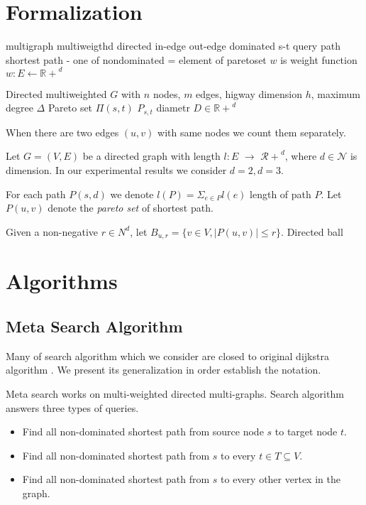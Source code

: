 
\section{Formalization}
multigraph 
multiweigthd
directed
in-edge out-edge
dominated
s-t query
path
shortest path - one of nondominated = element of paretoset
$w$ is weight function $w: E \leftarrow \mathbb{R+}^d$

Directed multiweighted $G$ with
$n$ nodes,
$m$ edges,
higway dimension $h$,
maximum degree $\Delta$
Pareto set $\Pi(s,t)$ $P_{s,t}$
diametr $D \in \mathbb{R+}^d$

When there are two edges $(u,v)$ with same nodes we count them
separately. 


Let $G = (V,E)$ be a directed graph with length
$l: E$ 
$ \rightarrow $
$\mathcal{R+}^d$, 
where $d \in \mathcal{N}$ is
dimension. In our experimental results
we consider $d=2, d=3$.

For each path $P(s,d)$ we denote 
$l(P) = \Sigma_{e\in P} l(e) $
length of path $P$.
Let $P(u,v)$ denote the \emph{pareto set} of shortest path.

Given a non-negative $r \in \mathcal{}{N}^d $, let $B_{u,r} = 
\{ v \in V, |P(u,v)| \le r \} $.
Directed ball


\section{Algorithms}

\subsection{Meta Search Algorithm}

Many of search algorithm which we consider
are closed to original dijkstra algorithm \cite{dijkstra1959note}.
We present its generalization in order establish the notation.

Meta search works on multi-weighted directed multi-graphs. 
Search algorithm answers three types of queries.
\begin{itemize}
\item Find all non-dominated shortest path from source node $s$ to target node $t$.
\item Find all non-dominated shortest path from $s$ to every $t \in T \subseteq V$.
\item Find all non-dominated shortest path from $s$ to every other vertex in the graph.
\end{itemize}

